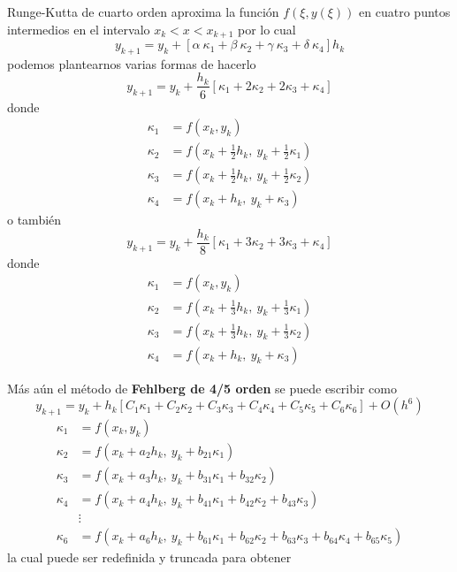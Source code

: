 \documentclass[spanish,titlepage,11pt]{article}
\begin{document}
\newline Runge-Kutta de cuarto orden aproxima la funci\'{o}n $f\left(
\xi,y(\xi)\right)  $ en cuatro puntos intermedios en el intervalo
$x_{k}<x<x_{k+1}$ por lo cual
\[
y_{k+1}=y_{k}+\left[  \alpha\ \kappa_{1}+\beta\ \kappa_{2}+\gamma\ \kappa
_{3}+\delta\ \kappa_{4}\right]  h_{k}
\]
podemos plantearnos varias formas de hacerlo
\[
y_{k+1}=y_{k}+\frac{h_{k}}{6}\left[  \kappa_{1}+2\kappa_{2}+2\kappa_{3}%
+\kappa_{4}\right]
\]
donde
\begin{align*}
\kappa_{1}  &  =f\left(  x_{k},y_{k}\right) \\
\kappa_{2}  &  =f\left(  x_{k}+\frac{1}{2}h_{k},\ y_{k}+\frac{1}{2}\kappa
_{1}\right) \\
\kappa_{3}  &  =f\left(  x_{k}+\frac{1}{2}h_{k},\ y_{k}+\frac{1}{2}\kappa
_{2}\right) \\
\kappa_{4}  &  =f\left(  x_{k}+h_{k},\ y_{k}+\kappa_{3}\right)
\end{align*}
o tambi\'{e}n
\[
y_{k+1}=y_{k}+\frac{h_{k}}{8}\left[  \kappa_{1}+3\kappa_{2}+3\kappa_{3}%
+\kappa_{4}\right]
\]
donde
\begin{align*}
\kappa_{1}  &  =f\left(  x_{k},y_{k}\right) \\
\kappa_{2}  &  =f\left(  x_{k}+\frac{1}{3}h_{k},\ y_{k}+\frac{1}{3}\kappa
_{1}\right) \\
\kappa_{3}  &  =f\left(  x_{k}+\frac{1}{3}h_{k},\ y_{k}+\frac{1}{3}\kappa
_{2}\right) \\
\kappa_{4}  &  =f\left(  x_{k}+h_{k},\ y_{k}+\kappa_{3}\right)
\end{align*}

M\'{a}s a\'{u}n el m\'{e}todo de \textbf{Fehlberg de 4/5 orden} se puede
escribir como
\[
y_{k+1}=y_{k}+h_{k}\left[  C_{1}\kappa_{1}+C_{2}\kappa_{2}+C_{3}\kappa
_{3}+C_{4}\kappa_{4}+C_{5}\kappa_{5}+C_{6}\kappa_{6}\right]  +O(h^{6})
\]
\begin{align*}
\kappa_{1}  &  =f\left(  x_{k},y_{k}\right) \\
\kappa_{2}  &  =f\left(  x_{k}+a_{2}h_{k},\ y_{k}+b_{21}\kappa_{1}\right) \\
\kappa_{3}  &  =f\left(  x_{k}+a_{3}h_{k},\ y_{k}+b_{31}\kappa_{1}%
+b_{32}\kappa_{2}\right) \\
\kappa_{4}  &  =f\left(  x_{k}+a_{4}h_{k},\ y_{k}+b_{41}\kappa_{1}%
+b_{42}\kappa_{2}+b_{43}\kappa_{3}\right) \\
&  \vdots\\
\kappa_{6}  &  =f\left(  x_{k}+a_{6}h_{k},\ y_{k}+b_{61}\kappa_{1}%
+b_{62}\kappa_{2}+b_{63}\kappa_{3}+b_{64}\kappa_{4}+b_{65}\kappa_{5}\right)
\end{align*}
la cual puede ser redefinida y truncada para obtener%
\end{document}
